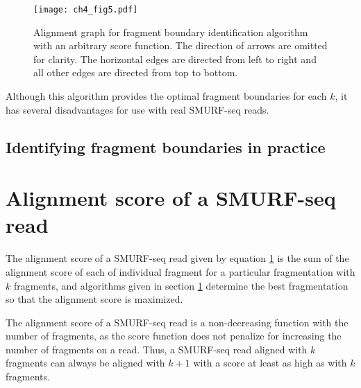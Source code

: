 \begin{figure}[h!]
\centering
\texttt{[image: ch4\_fig5.pdf]}
\caption[Alignment graph for fragment boundary identification algorithm
  with an arbitrary score function]{
  Alignment graph for fragment boundary identification algorithm
  with an arbitrary score function. The direction of arrows are omitted
  for clarity. The horizontal edges are directed from left to right and
  all other edges are directed from top to bottom.}
\label{frag_alg}
\end{figure}

Although this algorithm provides the optimal fragment boundaries for each
$k$, it has several disadvantages for use with real SMURF-seq reads.


\subsection{Identifying fragment boundaries in practice}


\section{Alignment score of a SMURF-seq read}
The alignment score of a SMURF-seq read given by equation \ref{}
is the sum of the alignment score of each of individual fragment
for a particular fragmentation with $k$ fragments,
and algorithms given in section \ref{} determine the best fragmentation
so that the alignment score is maximized.

The alignment score of a SMURF-seq read is a non-decreasing function with
the number of fragments, as the score function does not penalize for
increasing the number of fragments on a read. Thus, a SMURF-seq read
aligned with $k$ fragments can always be aligned with $k+1$ with a
score at least as high as with $k$ fragments.

